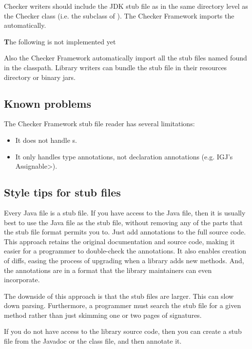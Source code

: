 Checker writers should include the JDK stub file as  in the
same directory level as the Checker class (i.e. the subclass of
).  The Checker Framework imports the 
automatically.

{\textbf The following is not implemented yet}

Also the Checker Framework automatically import all the stub files named
 found in the classpath.  Library writers can bundle the
stub file in their resources directory or binary jars.

\subsection{Known problems}


The Checker Framework stub file reader has several limitations:

\begin{itemize}
\item
  It does not handle s.
\item
  It only handles type annotations, not declaration annotations (e.g. IGJ's \<Assignable>).
\end{itemize}


\subsection{Style tips for stub files}

Every Java file is a stub file.  If you have access to the Java file, then
it is usually best to use the Java file as the stub file, without removing
any of the parts that the stub file format permits you to.  Just add
annotations to the full source code.  This approach retains the original
documentation and source code, making it easier for a programmer to
double-check the annotations.  It also enables creation of diffs, easing
the process of upgrading when a library adds new methods.  And, the
annotations are in a format that the library maintainers can even
incorporate.

The downside of this approach is that the stub files are larger.  This can
slow down parsing.  Furthermore, a programmer must search the stub file
for a given method rather than just skimming one or two pages of signatures.

If you do not have access to the library source code, then you can create a
stub file from the Javadoc or the class file, and then annotate it.



